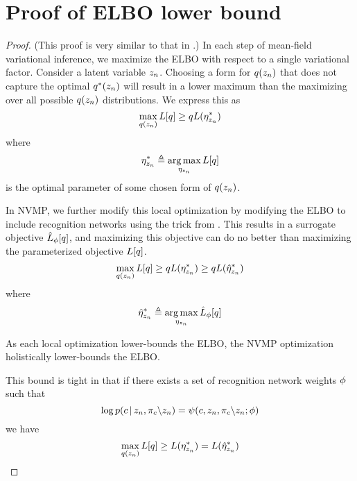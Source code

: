 \section{Proof of ELBO lower bound}
\label{sec:nvmp-proof}

\begin{proof}
(This proof is very similar to that in \citet{Johnson2016}.)
In each step of mean-field variational inference,
we maximize the ELBO with respect to a single variational factor.
Consider a latent variable $z_n$.
Choosing a form for $q(z_n)$
that does not capture the optimal $q^*(z_n)$
will result
in a lower maximum than the maximizing
over all possible $q(z_n)$ distributions.
We express this as
\begin{equation}
    \max_{q(z_n)}L[q] \ge q  L(\eta_{z_n}^*)
\end{equation}
where 
\[
\eta_{z_n}^* \triangleq \operatorname*{arg\,max}_{\eta_{z_n}} L[q]
\]
is the optimal parameter of some chosen form of $q(z_n)$.

In NVMP, we further modify this local optimization
by modifying the ELBO to include recognition networks
using the trick from \cite{Johnson2016}.
This results in a surrogate objective $\hat{L}_\phi[q]$,
and maximizing this objective can do no better than maximizing the
parameterized objective $L[q]$.
\begin{equation}
    \max_{q(z_n)}L[q] \ge q  L(\eta_{z_n}^*) \ge q
    L(\hat{\eta}_{z_n}^*)
\end{equation}
where 
\[
\hat{\eta}_{z_n}^* \triangleq \operatorname*{arg\,max}_{\eta_{z_n}} \hat{L}_\phi[q]
\]

As each local optimization lower-bounds the ELBO,
the NVMP optimization holistically 
lower-bounds the ELBO.

This bound is tight in that
if there exists a set of recognition
network weights $\phi$ such that
\begin{equation}
\log p(c \,|\, z_n, \pi_c \backslash z_n) = \psi(c, z_n, \pi_{c} \backslash z_n; \phi) \\
\end{equation}
we have
\begin{equation}
    \max_{q(z_n)}L[q] \geq  L(\eta_{z_n}^*) = 
    L(\hat{\eta}_{z_n}^*)
\end{equation}
\end{proof}

